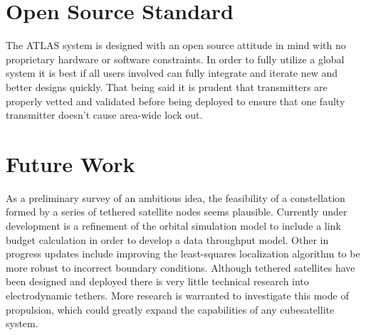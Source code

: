 \documentclass{article}
\begin{document}
\section{Open Source Standard}
The ATLAS system is designed with an open source attitude in mind with no proprietary hardware or software constraints. In order to fully utilize a global system it is best if all users involved can fully integrate and iterate new and better designs quickly. That being said it is prudent that transmitters are properly vetted and validated before being deployed to ensure that one faulty transmitter doesn't cause area-wide lock out. 

\section{Future Work}
As a preliminary survey of an ambitious idea, the feasibility of a constellation formed by a series of tethered satellite nodes seems plausible. Currently under development is a refinement of the orbital simulation model to include a link budget calculation in order to develop a data throughput model. Other in progress updates include improving the least-squares localization algorithm to be more robust to incorrect boundary conditions. Although tethered satellites have been designed and deployed there is very little technical research into electrodynamic tethers. More research is warranted to investigate this mode of propulsion, which could greatly expand the capabilities of any cubesatellite system. 
\end{document}
